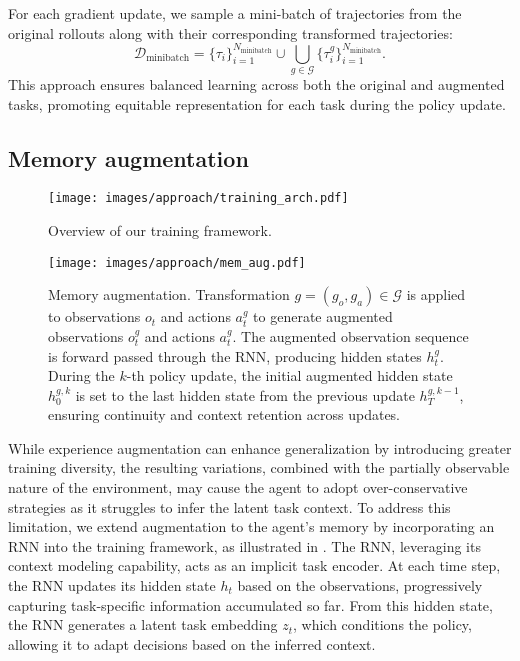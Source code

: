 For each gradient update, we sample a mini-batch of trajectories from the original rollouts along with their corresponding transformed trajectories:
\[
\mathcal{D}_{\text{minibatch}} = \{\tau_i\}_{i=1}^{N_{\text{minibatch}}} \cup \bigcup_{g \in \mathcal{G}} \{\tau_i^g\}_{i=1}^{N_{\text{minibatch}}}.
\]
This approach ensures balanced learning across both the original and augmented tasks, promoting equitable representation for each task during the policy update.


\subsection{Memory augmentation}

\begin{figure}
\centering
\texttt{[image: images/approach/training\_arch.pdf]}
\caption{Overview of our training framework.}
\label{fig:training_framework}
\end{figure}

\begin{figure*}
\centering
\texttt{[image: images/approach/mem\_aug.pdf]}
\caption{Memory augmentation. Transformation \( g = (g_o, g_a) \in \mathcal{G} \) is applied to observations \(o_t\) and actions \(a_t^g\) to generate augmented observations \(o_t^g\) and actions \(a_t^g\). The augmented observation sequence is forward passed through the RNN, producing hidden states \(h_t^g\).
During the \(k\)-th policy update, the initial augmented hidden state \(h_0^{g,k}\) is set to the last hidden state from the previous update \(h_T^{g,k-1}\), ensuring continuity and context retention across updates.}
\label{fig:mem_aug}
\end{figure*}

While experience augmentation can enhance generalization by introducing greater training diversity, the resulting variations, combined with the partially observable nature of the environment, may cause the agent to adopt over-conservative strategies as it struggles to infer the latent task context.
To address this limitation, we extend augmentation to the agent's memory by incorporating an RNN into the training framework, as illustrated in .
The RNN, leveraging its context modeling capability, acts as an implicit task encoder.
At each time step, the RNN updates its hidden state \( h_t \) based on the observations, progressively capturing task-specific information accumulated so far.
From this hidden state, the RNN generates a latent task embedding \( z_t \), which conditions the policy, allowing it to adapt decisions based on the inferred context.

